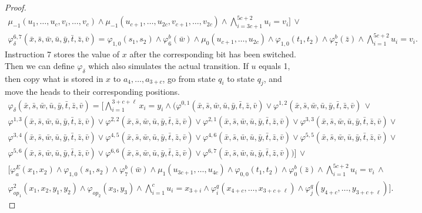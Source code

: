 \begin{proof}
\begin{multline*}
	\mu_{-1}(u_1,\ldots,u_c,v_i,\ldots,v_c) \wedge \mu_{-1}(u_{c+1},\ldots,u_{2c},v_{c+1},\ldots,v_{2c}) \wedge \bigwedge_{i = 3c+1}^{5c+2} u_i = v_i]\,\vee \\
	\varphi^{6,7}_{\delta}(\bar{x},\bar{s},\bar{w},\bar{u},\bar{y},\bar{t},\bar{z},\bar{v}) = \varphi_{1,0}(s_1,s_2) \wedge \varphi^b_6(\bar{w}) \wedge \mu_0(u_{c+1},\ldots,u_{2c}) \wedge \varphi_{1,0}(t_1,t_2) \wedge \varphi^b_7(\bar{z}) \wedge \bigwedge_{i = 1}^{5c+2} u_i = v_i.
	\end{multline*}
	Instruction 7 stores the value of $x$ after the corresponding bit has been switched. Then we can define $\varphi_{\delta}$ which also simulates the actual transition. If $u$ equals 1, then copy what is stored in $x$ to $a_4,\ldots,a_{3+c}$, go from state $q_i$ to state $q_j$, and move the heads to their corresponding positions.
	\begin{multline*}
	\varphi_{\delta}(\bar{x},\bar{s},\bar{w},\bar{u},\bar{y},\bar{t},\bar{z},\bar{v}) = 	[\bigwedge_{i = 1}^{3+c+\ell} x_i = y_i \wedge (\varphi^{0,1}(\bar{x},\bar{s},\bar{w},\bar{u},\bar{y},\bar{t},\bar{z},\bar{v}) \vee \varphi^{1,2}(\bar{x},\bar{s},\bar{w},\bar{u},\bar{y},\bar{t},\bar{z},\bar{v})\, \vee \\ \varphi^{1,3}(\bar{x},\bar{s},\bar{w},\bar{u},\bar{y},\bar{t},\bar{z},\bar{v}) \vee \varphi^{2,2}(\bar{x},\bar{s},\bar{w},\bar{u},\bar{y},\bar{t},\bar{z},\bar{v}) \vee \varphi^{2,1}(\bar{x},\bar{s},\bar{w},\bar{u},\bar{y},\bar{t},\bar{z},\bar{v}) \vee \varphi^{3,3}(\bar{x},\bar{s},\bar{w},\bar{u},\bar{y},\bar{t},\bar{z},\bar{v}) \vee \\ \varphi^{3,4}(\bar{x},\bar{s},\bar{w},\bar{u},\bar{y},\bar{t},\bar{z},\bar{v}) \vee \varphi^{4,5}(\bar{x},\bar{s},\bar{w},\bar{u},\bar{y},\bar{t},\bar{z},\bar{v}) \vee \varphi^{4,6}(\bar{x},\bar{s},\bar{w},\bar{u},\bar{y},\bar{t},\bar{z},\bar{v}) \vee \varphi^{5,5}(\bar{x},\bar{s},\bar{w},\bar{u},\bar{y},\bar{t},\bar{z},\bar{v}) \vee \\ \varphi^{5,6}(\bar{x},\bar{s},\bar{w},\bar{u},\bar{y},\bar{t},\bar{z},\bar{v}) \vee \varphi^{6,6}(\bar{x},\bar{s},\bar{w},\bar{u},\bar{y},\bar{t},\bar{z},\bar{v}) \vee \varphi^{6,7}(\bar{x},\bar{s},\bar{w},\bar{u},\bar{y},\bar{t},\bar{z},\bar{v}))] \, \vee \\
	[\varphi^E_a(x_1,x_2) \wedge \varphi_{1,0}(s_1,s_2) \wedge \varphi^b_7(\bar{w}) \wedge \mu_1(u_{3c+1},\ldots,u_{4c}) \wedge \varphi_{0,0}(t_1,t_2) \wedge \varphi^b_0(\bar{z}) \wedge \bigwedge_{i = 1}^{5c+2} u_i = v_i \,\wedge \\
	\varphi^2_{op_1}(x_1,x_2,y_1,y_2) \wedge \varphi_{op_2}(x_3,y_3) \wedge \bigwedge_{i = 1}^c u_i = x_{3+i} \wedge \varphi^q_i(x_{4+c},\ldots,x_{3+c+\ell}) \wedge \varphi^q_j(y_{4+c},\ldots,y_{3+c+\ell})].

\end{multline*}
\end{proof}
